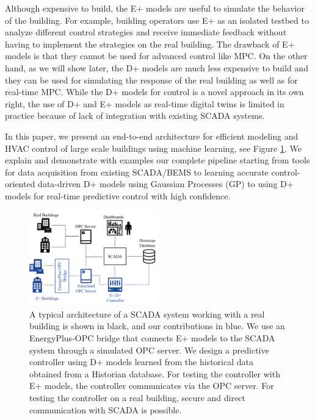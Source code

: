 Although expensive to build, the E+ models are useful to simulate the behavior of the building. For example, building operators use E+ as an isolated testbed to analyze different control strategies and receive immediate feedback without having to implement the strategies on the real building.
The drawback of E+ models is that they cannot be used for advanced control like MPC.
On the other hand, as we will show later, %
the D+ models are much less expensive to build and they can be used for simulating the response of the real building as well as for real-time MPC.
While the D+ models for control is a novel approach in its own right, the use of D+ and E+ models as real-time digital twins is limited in practice because of lack of integration with existing SCADA systems.

In this paper, we present an end-to-end architecture for efficient modeling and HVAC control of large scale buildings using machine learning, see Figure \ref{F:intro}. 
We explain and demonstrate with examples our complete pipeline starting from tools for data acquisition from existing SCADA/BEMS to learning accurate control-oriented data-driven D+ models using Gaussian Processes (GP) to using D+ models for real-time predictive control with high confidence.

\begin{figure}[t]
  \includegraphics[width=0.5\textwidth]{images/overview.png}
  \caption{A typical architecture of a SCADA system working with a real building is shown in black, and our contributions in blue. We use an EnergyPlus-OPC bridge that connects E+ models to the SCADA system through a simulated OPC server. We design a predictive controller using D+ models learned from the historical data obtained from a Historian database. For testing the controller with E+ models, the controller communicates via the OPC server. For testing the controller on a real building, secure and direct communication with SCADA is possible.}
  \label{F:intro}
\end{figure}

